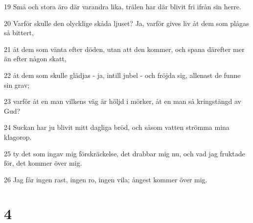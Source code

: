 \par 19 Små och stora äro där varandra lika, trälen har där blivit fri ifrån sin herre.
\par 20 Varför skulle den olycklige skåda ljuset? Ja, varför gives liv åt dem som plågas så bittert,
\par 21 åt dem som vänta efter döden, utan att den kommer, och spana därefter mer än efter någon skatt,
\par 22 åt dem som skulle glädjas - ja, intill jubel - och fröjda sig, allenast de funne sin grav;
\par 23 varför åt en man vilkens väg är höljd i mörker, åt en man så kringstängd av Gud?
\par 24 Suckan har ju blivit mitt dagliga bröd, och såsom vatten strömma mina klagorop.
\par 25 ty det som ingav mig förskräckelse, det drabbar mig nu, och vad jag fruktade för, det kommer över mig.
\par 26 Jag får ingen rast, ingen ro, ingen vila; ångest kommer över mig.

\chapter{4}

